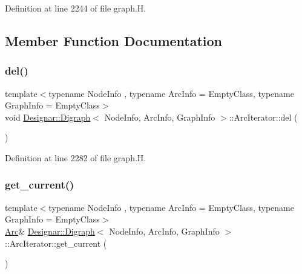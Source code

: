 Definition at line 2244 of file graph.\+H.



\subsection{Member Function Documentation}
\mbox{\label{class_designar_1_1_digraph_1_1_arc_iterator_aa4f42b888685025c5c3f2e730df4eb36}} 
\subsubsection{\texorpdfstring{del()}{del()}}
{\footnotesize\ttfamily template$<$typename Node\+Info , typename Arc\+Info  = Empty\+Class, typename Graph\+Info  = Empty\+Class$>$ \\
void \hyperlink{class_designar_1_1_digraph}{Designar\+::\+Digraph}$<$ Node\+Info, Arc\+Info, Graph\+Info $>$\+::Arc\+Iterator\+::del (\begin{DoxyParamCaption}{ }\end{DoxyParamCaption})\hspace{0.3cm}{\ttfamily [inline]}}



Definition at line 2282 of file graph.\+H.

\mbox{\label{class_designar_1_1_digraph_1_1_arc_iterator_af7734cd84a4dd523f276064833abaa85}} 
\subsubsection{\texorpdfstring{get\+\_\+current()}{get\_current()}\hspace{0.1cm}{\footnotesize\ttfamily [1/2]}}
{\footnotesize\ttfamily template$<$typename Node\+Info , typename Arc\+Info  = Empty\+Class, typename Graph\+Info  = Empty\+Class$>$ \\
\hyperlink{class_designar_1_1_digraph_a0ceb278671f2a535c00fddccdeafd69f}{Arc}\& \hyperlink{class_designar_1_1_digraph}{Designar\+::\+Digraph}$<$ Node\+Info, Arc\+Info, Graph\+Info $>$\+::Arc\+Iterator\+::get\+\_\+current (\begin{DoxyParamCaption}{ }\end{DoxyParamCaption})\hspace{0.3cm}{\ttfamily [inline]}}



